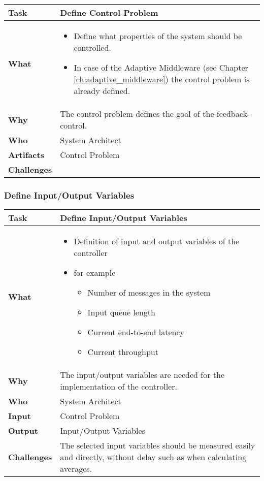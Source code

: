 \begin{tabularx}{\textwidth}{@{} l X @{}}
	\caption{Define Control Problem} \label{table:ch6_Task_Define_Control_Problem}\\
	\toprule 
	\bfseries Task & Define Control Problem\\
	\midrule 
	\bfseries What & 
	\begin{itemize}
		\item Define what properties of the system should be controlled.
		\item In case of the Adaptive Middleware (see Chapter \ref{ch:adaptive_middleware}) the control problem is already defined.
	\end{itemize}
	\\
	\midrule 
	\bfseries Why & The control problem defines the goal of the feedback-control.\\
	\midrule 
	\bfseries Who & System Architect\\
	\midrule 
	\bfseries Artifacts & Control Problem\\
	\midrule 
	\bfseries Challenges & \\
	\bottomrule 
\end{tabularx}


\subsubsection{Define Input/Output Variables}

\begin{tabularx}{\textwidth}{@{} l X @{}}
	\caption{Define Input/Output Variables} \label{table:ch6_Task_Define_Controller_Variables}\\
	\toprule 
	\bfseries Task & Define Input/Output Variables\\
	\midrule 
	\bfseries What &
	\begin{itemize}
		\item Definition of input and output variables of the controller
		\item for example
		\begin{itemize}
			\item Number of messages in the system
			\item Input queue length
			\item Current end-to-end latency
			\item Current throughput
		\end{itemize}
	\end{itemize}
	\\
	\midrule 
	\bfseries Why & The input/output variables are needed for the implementation of the controller.\\
	\midrule 
	\bfseries Who & System Architect\\
	\midrule 
	\bfseries Input & Control Problem\\
	\midrule 
	\bfseries Output & Input/Output Variables\\
	\midrule 
	\bfseries Challenges & The selected input variables should be measured easily and directly, without delay such as when calculating averages.\\
	\bottomrule 
\end{tabularx}

